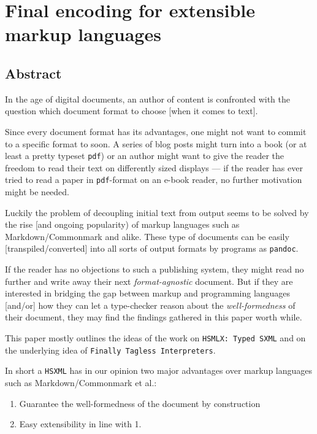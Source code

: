 \documentclass[11pt]{article}
\author{Jonas Benn}
\date{\today}
\title{}
\begin{document}
\tableofcontents

\section{Final encoding for extensible markup languages}
\label{sec:org2648b02}

\subsection{Abstract}
\label{sec:org1f19f60}

In the age of digital documents, an author of content is confronted with the
question which document format to choose [when it comes to text].

Since every document format has its advantages, one might not want to commit to
a specific format to soon. A series of blog posts might turn into a book (or at
least a pretty typeset \texttt{pdf}) or an author might want to give the reader the
freedom to read their text on differently sized displays — if the reader has
ever tried to read a paper in \texttt{pdf}-format on an e-book reader, no further
motivation might be needed.

Luckily the problem of decoupling initial text from output seems to be solved by
the rise [and ongoing popularity) of markup languages such as
Markdown/Commonmark and alike. These type of documents can be easily
[transpiled/converted] into all sorts of output formats by programs as \texttt{pandoc}. 

If the reader has no objections to such a publishing system, they might read no
further and write away their next \emph{format-agnostic} document. But if they are
interested in bridging the gap between markup and programming languages [and/or]
how they can let a type-checker reason about the \emph{well-formedness} of their
document, they may find the findings gathered in this paper worth while.

This paper mostly outlines the ideas of the work on \texttt{HSMLX: Typed SXML} and on
the underlying idea of \texttt{Finally Tagless Interpreters}.

In short a \texttt{HSXML} has in our opinion two major advantages over markup languages
such as Markdown/Commonmark et al.:

\begin{enumerate}
\item Guarantee the well-formedness of the document by construction
\item Easy extensibility in line with 1.
\end{enumerate}
\end{document}
